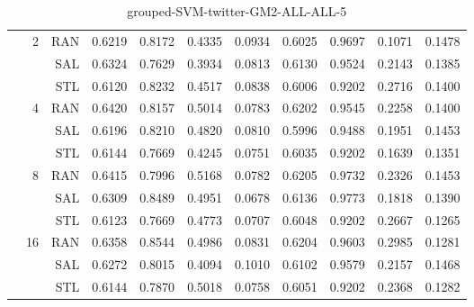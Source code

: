 \begin{center}
\begin{table}[htbp]
\begin{center}
\begin{tabular}{ | r | r | r | r | r | r | r | r | r | r | r |}
 & \multirow{3}{*}{2} & RAN & 0.6219 & 0.8172 & 0.4335 & 0.0934 & 0.6025 & 0.9697 & 0.1071 & 0.1478\\ \cline{3-11}
 &   & SAL & 0.6324 & 0.7629 & 0.3934 & 0.0813 & 0.6130 & 0.9524 & 0.2143 & 0.1385\\ \cline{3-11}
 &   & STL & 0.6120 & 0.8232 & 0.4517 & 0.0838 & 0.6006 & 0.9202 & 0.2716 & 0.1400\\ \cline{2-11}
 & \multirow{3}{*}{4} & RAN & 0.6420 & 0.8157 & 0.5014 & 0.0783 & 0.6202 & 0.9545 & 0.2258 & 0.1400\\ \cline{3-11}
 &   & SAL & 0.6196 & 0.8210 & 0.4820 & 0.0810 & 0.5996 & 0.9488 & 0.1951 & 0.1453\\ \cline{3-11}
 &   & STL & 0.6144 & 0.7669 & 0.4245 & 0.0751 & 0.6035 & 0.9202 & 0.1639 & 0.1351\\ \cline{2-11}
 & \multirow{3}{*}{8} & RAN & 0.6415 & 0.7996 & 0.5168 & 0.0782 & 0.6205 & 0.9732 & 0.2326 & 0.1453\\ \cline{3-11}
 &   & SAL & 0.6309 & 0.8489 & 0.4951 & 0.0678 & 0.6136 & 0.9773 & 0.1818 & 0.1390\\ \cline{3-11}
 &   & STL & 0.6123 & 0.7669 & 0.4773 & 0.0707 & 0.6048 & 0.9202 & 0.2667 & 0.1265\\ \cline{2-11}
 & \multirow{3}{*}{16} & RAN & 0.6358 & 0.8544 & 0.4986 & 0.0831 & 0.6204 & 0.9603 & 0.2985 & 0.1281\\ \cline{3-11}
 &   & SAL & 0.6272 & 0.8015 & 0.4094 & 0.1010 & 0.6102 & 0.9579 & 0.2157 & 0.1468\\ \cline{3-11}
 &   & STL & 0.6144 & 0.7870 & 0.5018 & 0.0758 & 0.6051 & 0.9202 & 0.2368 & 0.1282\\ \cline{2-11}
\hline
\end{tabular}
\caption{grouped-SVM-twitter-GM2-ALL-ALL-5}
\end{center}
 \end{table}
\end{center}

